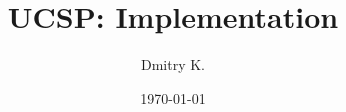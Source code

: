

\title{ \\[5em]
        UCSP: Implementation
        \\[3em]
      }
\author{Dmitry K.}
\date{ \vfill\today }


\begin{titlepage}
\maketitle
\thispagestyle{empty}
\end{titlepage}

